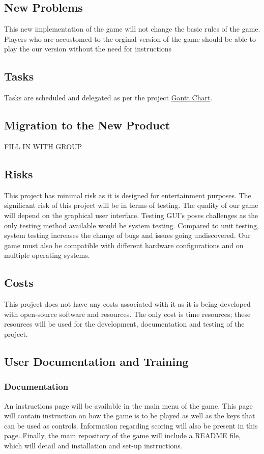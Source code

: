 \documentclass[12pt]{article}
\begin{document}
\subsection{New Problems}
This new implementation of the game will not change the basic rules of the game.
Players who are accustomed to the orginal version of the game should be able to play the our version without
the need for instructions
\subsection{Tasks}

Tasks are scheduled and delegated as per the project \href{}{\color{blue}Gantt Chart}.


\subsection{Migration to the New Product}
FILL IN WITH GROUP
\subsection{Risks}
This project has minimal risk as it is designed for entertainment purposes. The significant risk of this project will be in terms of testing. The quality of our game will depend on the graphical user interface. Testing GUI’s poses challenges as the only testing method available would be system testing. Compared to unit testing, system testing increases the change of bugs and issues going undiscovered. Our game must also be compatible with different hardware configurations and on multiple operating systems.
\subsection{Costs}
This project does not have any costs associated with it as it is being developed with open-source software and resources. The only cost is time resources; these resources will be used for the development, documentation and testing of the project. 
\subsection{User Documentation and Training}
\subsubsection{Documentation}
An instructions page will be available in the main menu of the game.
This page will contain instruction on how the game is to be played as well as the keys that can be used as controls. Information regarding scoring will also be present in this page.
Finally, the main repository of the game will include a README file, which will detail and installation and set-up instructions.
\end{document}
